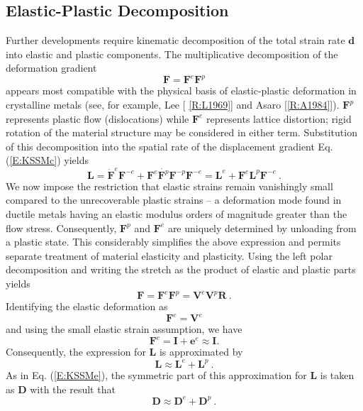 \documentclass[11pt]{report}
\numberwithin{equation}{section}
\newcommand{\nid}{\noindent}
\begin{document}
\subsection{Elastic-Plastic Decomposition}
Further developments require kinematic decomposition of the total strain rate $\mathbf{d}$
into elastic and plastic components. The multiplicative decomposition of the deformation gradient
%
\begin{equation}\label{E:EPDa}
\mathbf{F} = \mathbf{F}^e\mathbf{F}^p
\end{equation}
%
\nid appears most compatible with the physical basis of elastic-plastic deformation in 
crystalline metals (see, for example, Lee [ \ref{R:L1969}] and Asaro [\ref{R:A1984}]). $\mathbf{F}^p$
represents plastic 
flow (dislocations) while $\mathbf{F}^e$ represents lattice distortion; rigid rotation 
of the material structure may be considered in either term. Substitution of this 
decomposition into the spatial rate of the displacement gradient Eq. (\ref{E:KSSMc}) yields
%
\begin{equation}\label{E:EPDb}
\mathbf{L} = \dot{\mathbf{F}}^e\mathbf{F}^{-e} +
\mathbf{F}^e\dot{\mathbf{F}^p}\mathbf{F}^{-p} \mathbf{F}^{-e} =
\mathbf{L}^e + \mathbf{F}^e \mathbf{L}^p \mathbf{F}^{-e} \ .
\end{equation}
%
We now impose the restriction that elastic strains remain vanishingly small 
compared to the unrecoverable plastic strains -- a deformation mode found
in ductile metals having an elastic modulus orders of magnitude 
greater than the flow stress. Consequently, $\mathbf{F}^p$ and 
$\mathbf{F}^e$ are uniquely 
determined by unloading from a plastic state. This considerably 
simplifies the above expression and permits separate 
treatment of material elasticity and plasticity. Using the left polar 
decomposition and writing the stretch as the product of elastic 
and plastic parts yields
%
\begin{equation}\label{E:EPDc}
\mathbf{F} = \mathbf{F}^e \mathbf{F}^p =
\mathbf{V}^e\mathbf{V}^p\mathbf{R}\ .
\end{equation}
%
\nid Identifying the elastic deformation as
%
\begin{equation}\label{E:EPDd}
\mathbf{F}^e = \mathbf{V}^e
\end{equation}
%
\nid and using the small elastic strain assumption, we have
%
\begin{equation}\label{E:EPDe}
\mathbf{F}^e = \mathbf{I}+\mathbf{e}^e\approx  \mathbf{I} .
\end{equation}
%
\nid Consequently, the expression for $\mathbf{L}$ is approximated by
%
\begin{equation}\label{E:EPDf}
\mathbf{L}\approx \mathbf{L}^e+\mathbf{L}^p\ .
\end{equation}
%
\nid As in Eq. (\ref{E:KSSMe}), the symmetric part of this approximation 
for $\mathbf{L}$ is taken as $\mathbf{D}$ with the result that
%
\begin{equation}\label{E:EPDg}
\mathbf{D}\approx \mathbf{D}^e+\mathbf{D}^p\  .
\end{equation}
%
\end{document}
